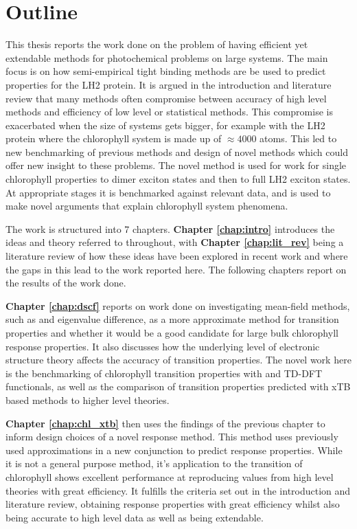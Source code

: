 %
%
\chapter{Outline}
\label{chap:outline}

This thesis reports the work done on the problem of having efficient yet extendable
methods for photochemical problems on large systems. The main focus is on how semi-empirical
tight binding methods are be used to predict properties for the LH2 protein. It 
is argued in the introduction and literature review that many methods often compromise
between accuracy of high level methods and efficiency of low level or statistical 
methods. This compromise is exacerbated when the size of systems gets bigger, for
example with the LH2 protein where the chlorophyll system is made up of $\approx
4000$ atoms. This led to new benchmarking of previous methods and design of novel
methods which could offer new insight to these problems. The novel method is used
for work for single chlorophyll properties to dimer exciton states and then to full 
LH2 exciton states. At appropriate stages it is benchmarked against relevant data,
and is used to make novel arguments that explain chlorophyll system phenomena.

The work is structured into 7 chapters. \textbf{Chapter \ref{chap:intro}} introduces
the ideas and theory referred to throughout, with \textbf{Chapter \ref{chap:lit_rev}} 
being a literature review of how these ideas have been explored in recent work and
where the gaps in this lead to the work reported here. The following chapters report
on the results of the work done.

\textbf{Chapter \ref{chap:dscf}} reports on work done on investigating
mean-field methods, such as \dscf and eigenvalue difference, as a more approximate
method for transition properties and whether it would be a good candidate for large
bulk chlorophyll response properties. It also discusses how the underlying level
of electronic structure theory affects the accuracy of transition properties. The
novel work here is the benchmarking of chlorophyll transition properties with \dscf
and TD-DFT functionals, as well as the comparison of transition properties predicted
with xTB based methods to higher level theories.

\textbf{Chapter \ref{chap:chl_xtb}} then uses the findings of the previous chapter to inform
design choices of a novel response method. This method uses previously used approximations
in a new conjunction to predict response properties. While it is not a general 
purpose method, it's application to the \Qy transition of chlorophyll shows excellent
performance at reproducing values from high level theories with great efficiency.
It fulfills the criteria set out in the introduction and literature review, obtaining
response properties with great efficiency whilst also being accurate to high level
data as well as being extendable.

